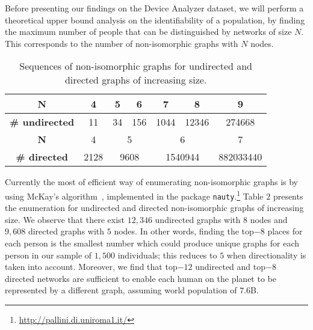 Before presenting our findings on the Device Analyzer dataset, we will perform a theoretical upper bound analysis on the identifiability of a population, by finding the maximum number of people that can be distinguished by networks of size $ N $.
This corresponds to the number of non-isomorphic graphs with $ N $ nodes.




\begin{table}[!]
	\begin{center}
	\resizebox{0.7\textwidth}{!}
	{
	\label{sequences_of_nonisomorphic}
	\begin{tabular}{|c|c|c|c|c|c|c|}
		\hline
		\textbf{N}             & 4    & 5           & 6           & 7            & 8             & 9         \\ \hline
		\textbf{\# undirected} & 11   & 34          & 156         & 1044         & 12346         & 274668    \\ \hline
		\textbf{N}             & 4    & \multicolumn{2}{c|}{5}    & \multicolumn{2}{c|}{6}       & 7         \\ \hline
		\textbf{\# directed}   & 2128 & \multicolumn{2}{c|}{9608} & \multicolumn{2}{c|}{1540944} & 882033440 \\ \hline
	\end{tabular}
}
	\caption{{Sequences of non-isomorphic graphs for undirected and directed graphs of increasing size.}}
		\end{center}
\end{table}


Currently the most of efficient way of enumerating  non-isomorphic graphs is by using McKay's algorithm~\cite{McKay}, implemented in the package \texttt{nauty}.\footnote{\url{http://pallini.di.uniroma1.it/}}
Table 2 presents the enumeration for undirected and directed non-isomorphic graphs of increasing size.
We observe that there exist $12,346$ undirected graphs with $8$ nodes and $9,608$ directed graphs with $5$ nodes.
In other words, finding the top$-8$ places for each person is the smallest number which could produce unique graphs for each person in our sample of $1,500$ individuals; this reduces to $5$ when directionality is taken into account.
Moreover, we find that top$-12$ undirected and top$-8$ directed networks are sufficient to enable each human on the planet to be represented by a different graph, assuming world population of $7.6$B.


